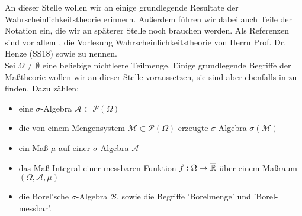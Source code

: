 An dieser Stelle wollen wir an einige grundlegende Resultate der Wahrscheinlichkeitstheorie erinnern. Außerdem führen wir dabei auch Teile der Notation ein, die wir an späterer Stelle noch brauchen werden. Als Referenzen sind vor allem \cite{brokate2016grundwissen}, die Vorlesung Wahrscheinlichkeitstheorie von Herrn Prof. Dr. Henze (SS18) sowie \cite{klenke2006wahrscheinlichkeitstheorie}
zu nennen.\\ Sei $ \Omega \not = \emptyset $ eine beliebige nichtleere Teilmenge.
Einige grundlegende Begriffe der Maßtheorie wollen wir an dieser Stelle voraussetzen, sie sind aber ebenfalls in \cite{klenke2006wahrscheinlichkeitstheorie} zu finden. Dazu zählen:
\begin{itemize}
	\item eine $ \sigma $-Algebra $ \mathcal{A} \subset \mathcal{P}(\Omega) $
	\item die von einem Mengensystem $ \mathcal{M} \subset \mathcal{P}(\Omega)  $ erzeugte $ \sigma $-Algebra $ \sigma(\mathcal{M}) $
	\item ein Maß $ \mu $ auf einer $ \sigma $-Algebra $ \mathcal{A} $
	\item das Maß-Integral einer messbaren Funktion $ f:\Omega \to \overline{\mathbb{R}} $ über einem Maßraum $ (\Omega, \mathcal{A},\mu) $
	\item die Borel'sche $ \sigma $-Algebra $ \mathcal{B} $, sowie die Begriffe 'Borelmenge' und 'Borel-messbar'.
\end{itemize}

